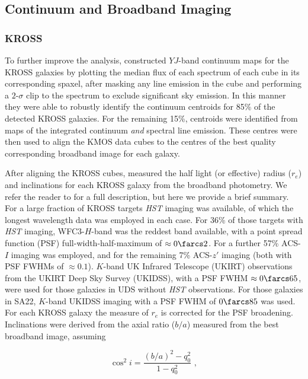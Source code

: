 \documentclass[a4paper,fleqn,usenatbib]{mnras}
\begin{document}
{\subsection{Continuum and Broadband Imaging}

\subsubsection{KROSS}

To further improve the analysis, \citet{Harrison:2017} constructed $YJ$-band continuum maps for the KROSS galaxies by plotting the median flux of each spectrum of each cube in its corresponding spaxel, after masking any line emission in the cube and performing a $2$-$\sigma$ clip to the spectrum to exclude significant sky emission. In this manner they were able to robustly identify the continuum centroids for 85\% of the detected KROSS galaxies. For the remaining 15\%, centroids were identified from maps of the integrated continuum {\em and} spectral line emission. These centres were then used to align the KMOS data cubes to the centres of the best quality corresponding broadband image for each galaxy.

After aligning the KROSS cubes, \citet{Harrison:2017} measured the half light (or effective) radius ($r_{e}$) and inclinations for each KROSS galaxy from the broadband photometry. We refer the reader to \citeauthor{Harrison:2017} for a full description, but here we provide a brief summary. For a large fraction of KROSS targets {\it HST} imaging was available, of which the longest wavelength data was employed in each case. For 36\% of those targets with {\it HST} imaging, WFC3-$H$-band was the reddest band available, with a point spread function (PSF) full-width-half-maximum of $\approx0\farcs2$. For a further 57\% ACS-$I$ imaging was employed, and for the remaining 7\% ACS-$z'$ imaging (both with PSF FWHMs of $\approx0.1$). $K$-band UK Infrared Telescope (UKIRT) observations from the UKIRT Deep Sky Survey (UKIDSS), with a PSF FWHM $\approx0\farcs65$, were used for those galaxies in UDS without {\it HST} observations. For those galaxies in SA22, $K$-band UKIDSS imaging with a PSF FWHM of $0\farcs85$ was used. For each KROSS galaxy the measure of $r_{e}$ is corrected for the PSF broadening. Inclinations were derived from the axial ratio ($b/a$) measured from the best broadband image, assuming

\begin{equation}\label{eq:inc}
\cos^{2} i = \frac{(b/a)^{2}-q_{0}^{2}}{1-q_{0}^{2}}\,\,,
\end{equation}

}
\end{document}
